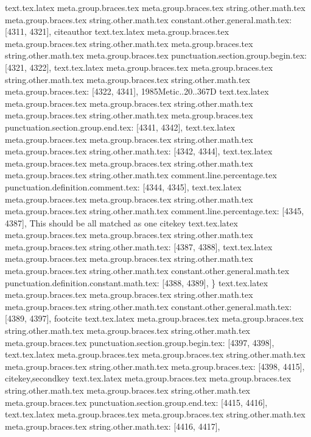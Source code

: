{{{{{{{{{{{{{{{{{{{{{{{{{{{{{{{{{{{{{{{{{{{{{{{{{{{{{{{{{{{{{{{{{{{{{{{{{{{{{{{{{{{{{{{{{{{{{{{{{{{{{{{{{{{{{{{{{{{{{{{{{{{{{{{{{{{{{{{{{text.tex.latex meta.group.braces.tex meta.group.braces.tex string.other.math.tex meta.group.braces.tex string.other.math.tex constant.other.general.math.tex: [4311, 4321], {citeauthor}
text.tex.latex meta.group.braces.tex meta.group.braces.tex string.other.math.tex meta.group.braces.tex string.other.math.tex meta.group.braces.tex punctuation.section.group.begin.tex: [4321, 4322], {{}
text.tex.latex meta.group.braces.tex meta.group.braces.tex string.other.math.tex meta.group.braces.tex string.other.math.tex meta.group.braces.tex: [4322, 4341], {1985Metic..20..367D}
text.tex.latex meta.group.braces.tex meta.group.braces.tex string.other.math.tex meta.group.braces.tex string.other.math.tex meta.group.braces.tex punctuation.section.group.end.tex: [4341, 4342], {}}
text.tex.latex meta.group.braces.tex meta.group.braces.tex string.other.math.tex meta.group.braces.tex string.other.math.tex: [4342, 4344], {  }
text.tex.latex meta.group.braces.tex meta.group.braces.tex string.other.math.tex meta.group.braces.tex string.other.math.tex comment.line.percentage.tex punctuation.definition.comment.tex: [4344, 4345], {%
text.tex.latex meta.group.braces.tex meta.group.braces.tex string.other.math.tex meta.group.braces.tex string.other.math.tex comment.line.percentage.tex: [4345, 4387], { This should be all matched as one citekey}
text.tex.latex meta.group.braces.tex meta.group.braces.tex string.other.math.tex meta.group.braces.tex string.other.math.tex: [4387, 4388], {
}
text.tex.latex meta.group.braces.tex meta.group.braces.tex string.other.math.tex meta.group.braces.tex string.other.math.tex constant.other.general.math.tex punctuation.definition.constant.math.tex: [4388, 4389], {\}
text.tex.latex meta.group.braces.tex meta.group.braces.tex string.other.math.tex meta.group.braces.tex string.other.math.tex constant.other.general.math.tex: [4389, 4397], {footcite}
text.tex.latex meta.group.braces.tex meta.group.braces.tex string.other.math.tex meta.group.braces.tex string.other.math.tex meta.group.braces.tex punctuation.section.group.begin.tex: [4397, 4398], {{}
text.tex.latex meta.group.braces.tex meta.group.braces.tex string.other.math.tex meta.group.braces.tex string.other.math.tex meta.group.braces.tex: [4398, 4415], {citekey,secondkey}
text.tex.latex meta.group.braces.tex meta.group.braces.tex string.other.math.tex meta.group.braces.tex string.other.math.tex meta.group.braces.tex punctuation.section.group.end.tex: [4415, 4416], {}}
text.tex.latex meta.group.braces.tex meta.group.braces.tex string.other.math.tex meta.group.braces.tex string.other.math.tex: [4416, 4417], {
}}}}}}}}}}}}}}}}}}}}}}}}}}}}}}}}}}}}}}}}}}}}}}}}}}}}}}}}}}}}}}}}}}}}}}}}}}}}}}}}}}}}}}}}}}}}}}}}}}}}}}}}}}}}}}}}}}}}}}}}}}}}}}}}}}}}}}}}}}}}
